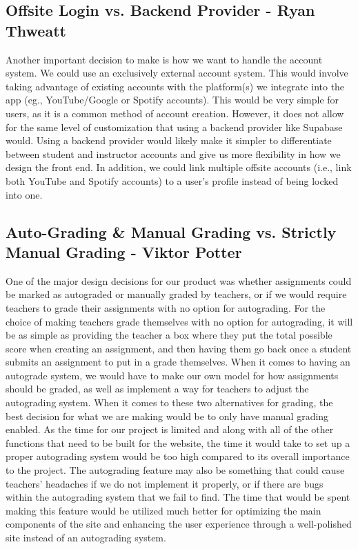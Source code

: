 \documentclass[12pt, letterpaper]{article}
\begin{document}
\subsection*{Offsite Login vs. Backend Provider - Ryan Thweatt}
Another important decision to make is how we want to handle the account system. We could use an exclusively external account system. This would involve taking advantage of existing accounts with the platform(s) we integrate into the app (eg., YouTube/Google or Spotify accounts). This would be very simple for users, as it is a common method of account creation. However, it does not allow for the same level of customization that using a backend provider like Supabase would. Using a backend provider would likely make it simpler to differentiate between student and instructor accounts and give us more flexibility in how we design the front end. In addition, we could link multiple offsite accounts (i.e., link both YouTube and Spotify accounts) to a user’s profile instead of being locked into one.

\subsection*{Auto-Grading \& Manual Grading vs. Strictly Manual Grading - Viktor Potter}
One of the major design decisions for our product was whether assignments could be marked as autograded or manually graded by teachers, or if we would require teachers to grade their assignments with no option for autograding. For the choice of making teachers grade themselves with no option for autograding, it will be as simple as providing the teacher a box where they put the total possible score when creating an assignment, and then having them go back once a student submits an assignment to put in a grade themselves. When it comes to having an autograde system, we would have to make our own model for how assignments should be graded, as well as implement a way for teachers to adjust the autograding system. When it comes to these two alternatives for grading, the best decision for what we are making would be to only have manual grading enabled. As the time for our project is limited and along with all of the other functions that need to be built for the website, the time it would take to set up a proper autograding system would be too high compared to its overall importance to the project. The autograding feature may also be something that could cause teachers' headaches if we do not implement it properly, or if there are bugs within the autograding system that we fail to find. The time that would be spent making this feature would be utilized much better for optimizing the main components of the site and enhancing the user experience through a well-polished site instead of an autograding system.
\end{document}
